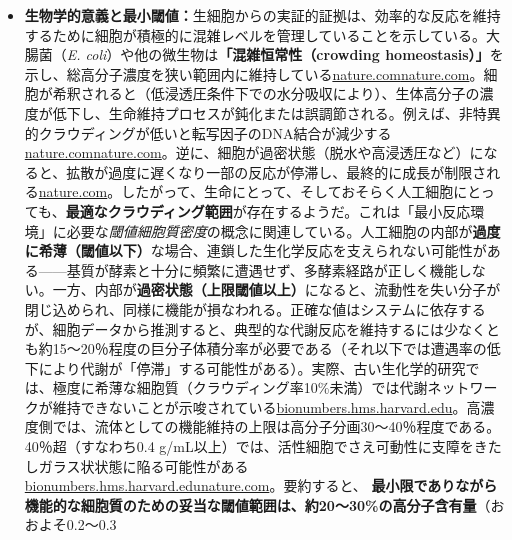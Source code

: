 \begin{itemize}
    \item \textbf{生物学的意義と最小閾値：}生細胞からの実証的証拠は、効率的な反応を維持するために細胞が積極的に混雑レベルを管理していることを示している。大腸菌（\textit{E. coli}）や他の微生物は\textbf{「混雑恒常性（crowding homeostasis）」}を示し、総高分子濃度を狭い範囲内に維持している\href{https://www.nature.com/articles/nrmicro.2017.17?error=cookies_not_supported&code=87b4b2eb-5370-49be-862f-ed6bad1e1b44\#:~:text=cytoplasm,relatively\%20constant\%20levels\%20of\%20macromolecules}{nature.com}\href{https://www.nature.com/articles/nrmicro.2017.17?error=cookies_not_supported&code=87b4b2eb-5370-49be-862f-ed6bad1e1b44\#:~:text=microbial\%20physiology,process\%20by\%20which\%20cells\%20maintain}{nature.com}。細胞が希釈されると（低浸透圧条件下での水分吸収により）、生体高分子の濃度が低下し、生命維持プロセスが鈍化または誤調節される。例えば、非特異的クラウディングが低いと転写因子のDNA結合が減少する\href{https://www.nature.com/articles/nrmicro.2017.17?error=cookies_not_supported&code=87b4b2eb-5370-49be-862f-ed6bad1e1b44\#:~:text=6,17\%2C\%20488\%E2\%80\%93496\%20\%282004}{nature.com}\href{https://www.nature.com/articles/nrmicro.2017.17?error=cookies_not_supported&code=87b4b2eb-5370-49be-862f-ed6bad1e1b44\#:~:text=7,191\%2C\%20231\%E2\%80\%93237\%20\%282009}{nature.com}。逆に、細胞が過密状態（脱水や高浸透圧など）になると、拡散が過度に遅くなり一部の反応が停滞し、最終的に成長が制限される\href{https://www.nature.com/articles/nrmicro.2017.17?error=cookies_not_supported&code=87b4b2eb-5370-49be-862f-ed6bad1e1b44\#:~:text=6,17\%2C\%20488\%E2\%80\%93496\%20\%282004}{nature.com}。したがって、生命にとって、そしておそらく人工細胞にとっても、\textbf{最適なクラウディング範囲}が存在するようだ。これは「最小反応環境」に必要な\textit{閾値細胞質密度}の概念に関連している。人工細胞の内部が\textbf{過度に希薄（閾値以下）}な場合、連鎖した生化学反応を支えられない可能性がある——基質が酵素と十分に頻繁に遭遇せず、多酵素経路が正しく機能しない。一方、内部が\textbf{過密状態（上限閾値以上）}になると、流動性を失い分子が閉じ込められ、同様に機能が損なわれる。正確な値はシステムに依存するが、細胞データから推測すると、典型的な代謝反応を維持するには少なくとも約15～20％程度の巨分子体積分率が必要である（それ以下では遭遇率の低下により代謝が「停滞」する可能性がある）。実際、古い生化学的研究では、極度に希薄な細胞質（クラウディング率10\%未満）では代謝ネットワークが維持できないことが示唆されている\href{https://bionumbers.hms.harvard.edu/bionumber.aspx?s=n&v=12&id=105814\#:~:text=Comments\%20In\%20both\%20stationary\%20and,range\%20wasn\%27t\%20located\%20in\%20Kao}{bionumbers.hms.harvard.edu}。高濃度側では、流体としての機能維持の上限は高分子分画30～40％程度である。40％超（すなわち0.4 g/mL以上）では、活性細胞でさえ可動性に支障をきたしガラス状状態に陥る可能性がある\href{https://bionumbers.hms.harvard.edu/bionumber.aspx?s=n&v=12&id=105814\#:~:text=Method\%20Using\%20equation\%2010\%20p,however\%20range}{bionumbers.hms.harvard.edu}\href{https://www.nature.com/articles/s41598-017-14883-y?error=cookies_not_supported&code=b0600d9e-c852-48ed-ab9c-7526a5c6893b\#:~:text=cancer\%20cells,0.3\%20g\%2FmL}{nature.com}。要約すると、 \textbf{最小限でありながら機能的な細胞質のための妥当な閾値範囲は、約20～30\%の高分子含有量}（おおよそ0.2～0.3 
\end{itemize}
